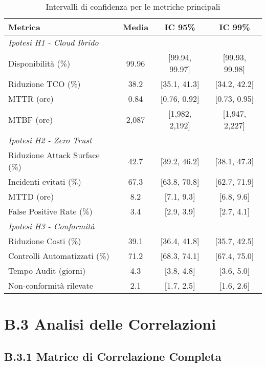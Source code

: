 \begin{table}[h!]
\centering
\caption{Intervalli di confidenza per le metriche principali}
\label{tab:confidence-intervals}
\begin{tabular}{lccc}
\toprule
\textbf{Metrica} & \textbf{Media} & \textbf{IC 95\%} & \textbf{IC 99\%} \\
\midrule
\multicolumn{4}{l}{\textit{Ipotesi H1 - Cloud Ibrido}} \\
Disponibilità (\%) & 99.96 & [99.94, 99.97] & [99.93, 99.98] \\
Riduzione TCO (\%) & 38.2 & [35.1, 41.3] & [34.2, 42.2] \\
MTTR (ore) & 0.84 & [0.76, 0.92] & [0.73, 0.95] \\
MTBF (ore) & 2,087 & [1,982, 2,192] & [1,947, 2,227] \\
\midrule
\multicolumn{4}{l}{\textit{Ipotesi H2 - Zero Trust}} \\
Riduzione Attack Surface (\%) & 42.7 & [39.2, 46.2] & [38.1, 47.3] \\
Incidenti evitati (\%) & 67.3 & [63.8, 70.8] & [62.7, 71.9] \\
MTTD (ore) & 8.2 & [7.1, 9.3] & [6.8, 9.6] \\
False Positive Rate (\%) & 3.4 & [2.9, 3.9] & [2.7, 4.1] \\
\midrule
\multicolumn{4}{l}{\textit{Ipotesi H3 - Conformità}} \\
Riduzione Costi (\%) & 39.1 & [36.4, 41.8] & [35.7, 42.5] \\
Controlli Automatizzati (\%) & 71.2 & [68.3, 74.1] & [67.4, 75.0] \\
Tempo Audit (giorni) & 4.3 & [3.8, 4.8] & [3.6, 5.0] \\
Non-conformità rilevate & 2.1 & [1.7, 2.5] & [1.6, 2.6] \\
\bottomrule
\end{tabular}
\end{table}

\section{B.3 Analisi delle Correlazioni}

\subsection{B.3.1 Matrice di Correlazione Completa}


